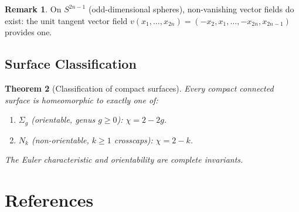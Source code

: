 \documentclass[12pt,a4paper]{amsart}
\newtheorem{theorem}{Theorem}[section]
\theoremstyle{definition}
\newtheorem{remark}[theorem]{Remark}
\begin{document}
\begin{remark}
On $S^{2n-1}$ (odd-dimensional spheres), non-vanishing vector fields do exist:
the unit tangent vector field $v(x_1,\ldots,x_{2n}) = (-x_2,x_1,\ldots,-x_{2n},x_{2n-1})$
provides one.
\end{remark}

\subsection{Surface Classification}

\begin{theorem}[Classification of compact surfaces]
Every compact connected surface is homeomorphic to exactly one of:
\begin{enumerate}[label=(\roman*)]
  \item $\Sigma_g$ (orientable, genus $g \geq 0$): $\chi = 2-2g$.
  \item $N_k$ (non-orientable, $k \geq 1$ crosscaps): $\chi = 2-k$.
\end{enumerate}
The Euler characteristic and orientability are complete invariants.
\end{theorem}

\section*{References}
\end{document}
